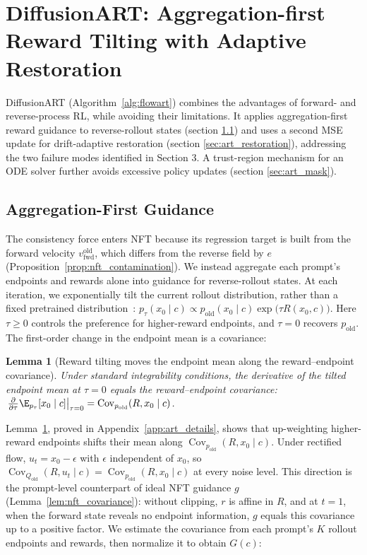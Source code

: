 \documentclass{article}
\newtheorem{lemma}{Lemma}
\begin{document}
\section{DiffusionART: Aggregation-first Reward Tilting with Adaptive Restoration}
\label{sec:method}
DiffusionART (Algorithm~\ref{alg:flowart}) combines the advantages of forward- and reverse-process RL, while avoiding their limitations. It applies aggregation-first reward guidance to reverse-rollout states (section \ref{sec:art_guidance}) and uses a second MSE update for drift-adaptive restoration (section \ref{sec:art_restoration}), addressing the two failure modes identified in Section 3. A trust-region mechanism for an ODE solver further avoids excessive policy updates (section \ref{sec:art_mask}). 




\subsection{Aggregation-First Guidance}
\label{sec:art_guidance}
The consistency force enters NFT because its regression target is built from the forward velocity $v_{\mathrm{fwd}}^{\mathrm{old}}$, which differs from the reverse field by $e$ (Proposition~\ref{prop:nft_contamination}). We instead aggregate each prompt's endpoints and rewards alone into guidance for reverse-rollout states. At each iteration, we exponentially tilt the current rollout distribution, rather than a fixed pretrained distribution~\citep{potaptchik2025tiltmatching,zhu2026crd}: $p_\tau(x_0\mid c)\propto p_{\mathrm{old}}(x_0\mid c)\exp\bigl(\tau R(x_0,c)\bigr)$. Here $\tau\geq0$ controls the preference for higher-reward endpoints, and $\tau=0$ recovers $p_{\mathrm{old}}$. The first-order change in the endpoint mean is a covariance:

\begin{lemma}[Reward tilting moves the endpoint mean along the reward--endpoint covariance]
\label{lem:art_tilt}
Under standard integrability conditions, the derivative of the tilted endpoint mean at $\tau = 0$ equals the reward–endpoint covariance:
$\left.\frac{\partial}{\partial\tau}\E_{p_\tau}[x_0\mid c]\right|_{\tau=0}
=\operatorname{Cov}_{p_{\mathrm{old}}}(R,x_0\mid c)$.
\end{lemma}
Lemma~\ref{lem:art_tilt}, proved in Appendix~\ref{app:art_details}, shows that up-weighting higher-reward endpoints shifts their mean along $\operatorname{Cov}_{p_{\mathrm{old}}}(R,x_0\mid c)$. Under rectified flow, $u_t=x_0-\epsilon$ with $\epsilon$ independent of $x_0$, so $\operatorname{Cov}_{Q_{\mathrm{old}}}(R,u_t\mid c)=\operatorname{Cov}_{p_{\mathrm{old}}}(R,x_0\mid c)$ at every noise level. This direction is the prompt-level counterpart of ideal NFT guidance $g$ (Lemma~\ref{lem:nft_covariance}): without clipping, $r$ is affine in $R$, and at $t=1$, when the forward state reveals no endpoint information, $g$ equals this covariance up to a positive factor. We estimate the covariance from each prompt's $K$ rollout endpoints and rewards, then normalize it to obtain $G(c)$:\par
\end{document}
